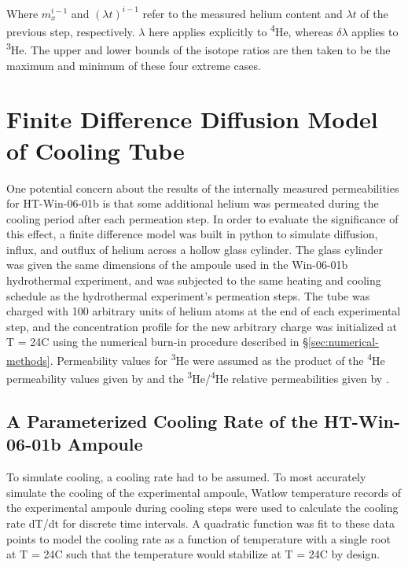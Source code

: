 Where $m_{x}^{i-1}$ and $\left(\lambda t \right)^{i-1}$ refer to the measured helium content and $\lambda t$ of the previous step, respectively. $\lambda$ here applies explicitly to \textsuperscript{4}He, whereas $\delta \lambda$ applies to \textsuperscript{3}He. The upper and lower bounds of the isotope ratios are then taken to be the maximum and minimum of these four extreme cases.

\section{Finite Difference Diffusion Model of Cooling Tube}\label{sec:finite-difference-diffusion-model-of-cooling-tube}

One potential concern about the results of the internally measured permeabilities for HT-Win-06-01b is that some additional helium was permeated
during the cooling period after each permeation step. In order to evaluate the significance of 
this effect, a finite difference model was built in python to simulate diffusion, influx, and
outflux of helium across a hollow glass cylinder. The glass
cylinder was given the same dimensions of the ampoule used in the
Win-06-01b hydrothermal experiment, and was subjected to the same
heating and cooling schedule as the hydrothermal experiment's permeation
steps. The tube was charged with 100 arbitrary units of helium atoms at
the end of each experimental step, and the concentration profile for
the new arbitrary charge was initialized at T = 24\textdegree C using the
numerical burn-in procedure described in \S\ref{sec:numerical-methods}. Permeability
values for \textsuperscript{3}He were assumed as the product of the \textsuperscript{4}He permeability
values given by \citet{swets1961} and the \textsuperscript{3}He/\textsuperscript{4}He relative
permeabilities given by \citet{jones1953}.

\subsection{A Parameterized Cooling Rate of the HT-Win-06-01b Ampoule}\label{sec:si-ampoule-cooling-rate}

To simulate cooling, a cooling rate had to be assumed. To most
accurately simulate the cooling of the experimental ampoule, Watlow temperature records
of the experimental ampoule during cooling steps were used to calculate the cooling rate dT/dt for discrete time intervals.
A quadratic function was fit to these data points to model the cooling rate as a function of temperature with a single root at 
T = 24\textdegree C such that the temperature would stabilize at T = 24\textdegree C by design.

